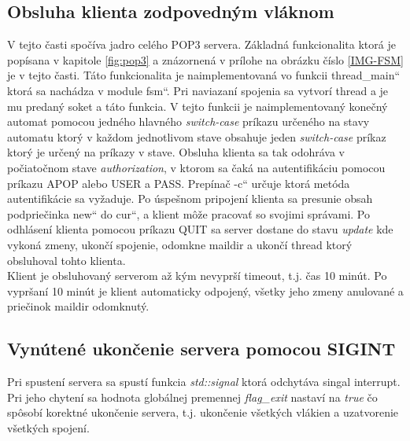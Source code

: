 \documentclass[11pt,a4paper]{article}
\providecommand{\uv}[1]{\quotedblbase #1\textquotedblleft}
\begin{document}
	\subsection{Obsluha klienta zodpovedným vláknom}
		\indent V tejto časti spočíva jadro celého POP3 servera. Základná funkcionalita ktorá je popísana v kapitole \ref{fig:pop3} a znázornená v prílohe na obrázku číslo \ref{IMG-FSM} je v tejto časti. Táto funkcionalita je naimplementovaná vo funkcii \uv{thread\_main} ktorá sa nachádza v module \uv{fsm}. Pri naviazaní spojenia sa vytvorí thread a je mu predaný soket a táto funkcia. V tejto funkcii je naimplementovaný konečný automat pomocou jedného hlavného \textit{switch-case} príkazu určeného na stavy automatu ktorý v každom jednotlivom stave obsahuje jeden \textit{switch-case} príkaz ktorý je určený na príkazy v stave. Obsluha klienta sa tak odohráva v počiatočnom stave \textit{authorization}, v ktorom sa čaká na autentifikáciu pomocou príkazu APOP alebo USER a PASS. Prepínač \uv{-c} určuje ktorá metóda autentifikácie sa vyžaduje. Po úspešnom pripojení klienta sa presunie obsah podpriečinka \uv{new} do \uv{cur}, a klient môže pracovať so svojimi správami. Po odhlásení klienta pomocou príkazu QUIT sa server dostane do stavu \textit{update} kde vykoná zmeny, ukončí spojenie, odomkne maildir a ukončí thread ktorý obsluhoval tohto klienta.\\[0.4em]
		\indent Klient je obsluhovaný serverom až kým nevyprší timeout, t.j. čas 10 minút. Po vypršaní 10 minút je klient automaticky odpojený, všetky jeho zmeny anulované a priečinok maildir odomknutý.

	\subsection{Vynútené ukončenie servera pomocou SIGINT}
		\indent Pri spustení servera sa spustí funkcia \textit{std::signal} ktorá odchytáva singal interrupt. Pri jeho chytení sa hodnota globálnej premennej \textit{flag\_exit} nastaví na \textit{true} čo spôsobí korektné ukončenie servera, t.j. ukončenie všetkých vlákien a uzatvorenie všetkých spojení.
\end{document}
